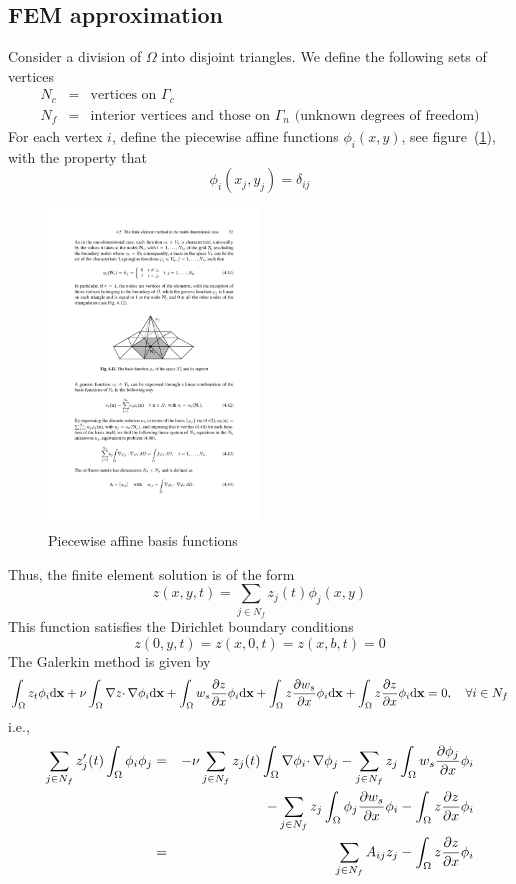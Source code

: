 \documentclass[12pt]{article}
\begin{document}
\subsection{FEM approximation}
Consider a division of $\Omega$ into disjoint triangles. We define the following sets of vertices
\begin{eqnarray*}
N_c &=& \mbox{vertices on $\Gamma_c$} \\
N_f &=& \mbox{interior vertices and those on $\Gamma_n$ (unknown degrees of freedom)}
\end{eqnarray*}
For each vertex $i$, define the piecewise affine functions $\phi_i(x,y)$, see figure~(\ref{fig:basis}), with the property that
\[
\phi_i(x_j, y_j) = \delta_{ij}
\]
\begin{figure}
\begin{center}
\includegraphics[width=0.5\textwidth]{tria_basis}
\caption{Piecewise affine basis functions}
\label{fig:basis}
\end{center}
\end{figure}
Thus, the finite element solution is of the form
\[
z(x,y,t) = \sum_{j \in N_f} z_j(t) \phi_j(x,y)
\]
This function satisfies the Dirichlet boundary conditions
\[
z(0,y,t) = z(x,0,t) = z(x,b,t) = 0
\]
The Galerkin method is given by
\[
\int_\Omega z_t \phi_i \textrm{d} {\mathbf x} + \nu \int_\Omega \nabla{z} \cdotp \nabla \phi_i \textrm{d} {\mathbf x} + \int_\Omega w_s \frac{\partial z}{\partial x} \phi_i \textrm{d} {\mathbf x} + \int_\Omega z \frac{\partial w_s}{\partial x} \phi_i \textrm{d} {\mathbf x} + \int_\Omega z \frac{\partial z}{\partial x} \phi_i \textrm{d} {\mathbf x} = 0, \quad
 \forall i \in N_f
\]
i.e.,
\begin{eqnarray*}
\sum_{j \in N_f} z_j'(t) \int_\Omega \phi_i \phi_j &=& - \nu \sum_{j \in N_f} z_j(t)  \int_\Omega \nabla \phi_i \cdotp \nabla \phi_j - \sum_{j \in N_f} z_j \int_\Omega w_s \frac{\partial \phi_j}{\partial x} \phi_i  \\
&& - \sum_{j \in N_f} z_j \int_\Omega \phi_j \frac{\partial w_s}{\partial x} \phi_i 
 - \int_\Omega z \frac{\partial z}{\partial x} \phi_i \\
 &=& \sum_{j \in N_f} A_{ij} z_j - \int_\Omega z \frac{\partial z}{\partial x} \phi_i
\end{eqnarray*}
\end{document}
